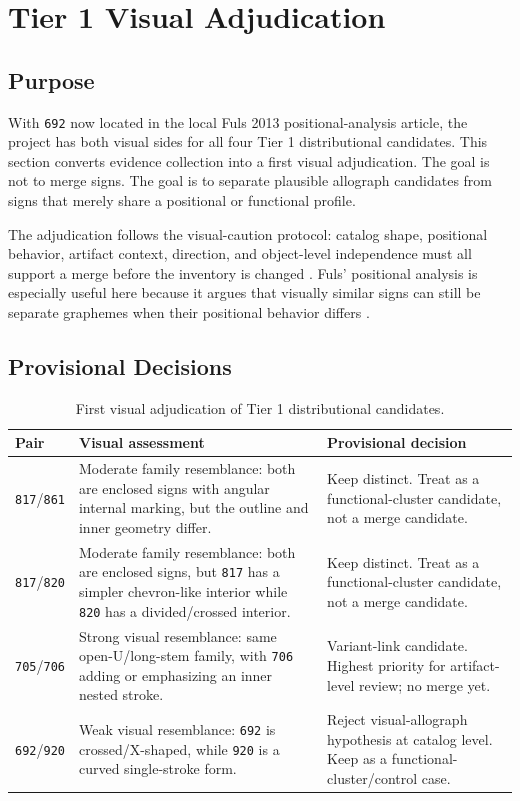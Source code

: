 \section{Tier 1 Visual Adjudication}

\subsection{Purpose}

With \texttt{692} now located in the local Fuls 2013 positional-analysis article, the project has both visual sides for all four Tier 1 distributional candidates. This section converts evidence collection into a first visual adjudication. The goal is not to merge signs. The goal is to separate plausible allograph candidates from signs that merely share a positional or functional profile.

The adjudication follows the visual-caution protocol: catalog shape, positional behavior, artifact context, direction, and object-level independence must all support a merge before the inventory is changed \citep{daggumati2021allographs}. Fuls' positional analysis is especially useful here because it argues that visually similar signs can still be separate graphemes when their positional behavior differs \citep{fuls2013positional}.

\subsection{Provisional Decisions}

\begin{table}[htbp]
\centering
\begin{tabular}{p{}p{}p{}}
\toprule
\textbf{Pair} & \textbf{Visual assessment} & \textbf{Provisional decision} \\
\midrule
\texttt{817}/\texttt{861} & Moderate family resemblance: both are enclosed signs with angular internal marking, but the outline and inner geometry differ. & Keep distinct. Treat as a functional-cluster candidate, not a merge candidate. \\
\texttt{817}/\texttt{820} & Moderate family resemblance: both are enclosed signs, but \texttt{817} has a simpler chevron-like interior while \texttt{820} has a divided/crossed interior. & Keep distinct. Treat as a functional-cluster candidate, not a merge candidate. \\
\texttt{705}/\texttt{706} & Strong visual resemblance: same open-U/long-stem family, with \texttt{706} adding or emphasizing an inner nested stroke. & Variant-link candidate. Highest priority for artifact-level review; no merge yet. \\
\texttt{692}/\texttt{920} & Weak visual resemblance: \texttt{692} is crossed/X-shaped, while \texttt{920} is a curved single-stroke form. & Reject visual-allograph hypothesis at catalog level. Keep as a functional-cluster/control case. \\
\bottomrule
\end{tabular}
\caption{First visual adjudication of Tier 1 distributional candidates.}
\label{tab:tier1-visual-adjudication}
\end{table}

